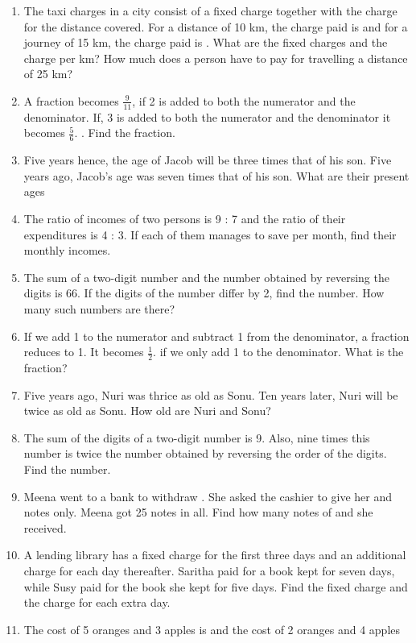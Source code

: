 \begin{enumerate}[label=\arabic*.,ref=\thesubsection.\theenumi]
\item The taxi charges in a city consist of a fixed charge together with the charge for the distance covered. For a distance of 10 km, the charge paid is  and for a journey of 15 km, the charge paid is . What are the fixed charges and the charge per km? How much does a person have to pay for travelling a distance of 25 km?
\item A fraction becomes $\frac{9}{ 11}$, if 2 is added to both the numerator and the denominator.
If, 3 is added to both the numerator and the denominator it becomes $\frac{5}{ 6}$.
 . Find the fraction.
\item Five years hence, the age of Jacob will be three times that of his son. Five years ago, Jacob’s age was seven times that of his son. What are their present ages
\item The ratio of incomes of two persons is 9 : 7 and the ratio of their expenditures is 4 : 3. If each of them manages to save  per month, find their monthly incomes.
\item The sum of a two-digit number and the number obtained by reversing the digits is 66. If the digits of the number differ by 2, find the number. How many such numbers are there?
%
\item If we add 1 to the numerator and subtract 1 from the denominator, a fraction reduces
to 1. It becomes
$\frac{1}{ 2}$.
if we only add 1 to the denominator. What is the fraction?
\item  Five years ago, Nuri was thrice as old as Sonu. Ten years later, Nuri will be twice as old as Sonu. How old are Nuri and Sonu?
\item  The sum of the digits of a two-digit number is 9. Also, nine times this number is twice the number obtained by reversing the order of the digits. Find the number.
\item  Meena went to a bank to withdraw . She asked the cashier to give her  and  notes only. Meena got 25 notes in all. Find how many notes of  and  she received.
\item  A lending library has a fixed charge for the first three days and an additional charge for each day thereafter. Saritha paid  for a book kept for seven days, while Susy paid  for the book she kept for five days. Find the fixed charge and the charge for each extra day.
%
\item The cost of 5 oranges and 3 apples is  and the cost of 2 oranges and 4 apples

\end{enumerate}
